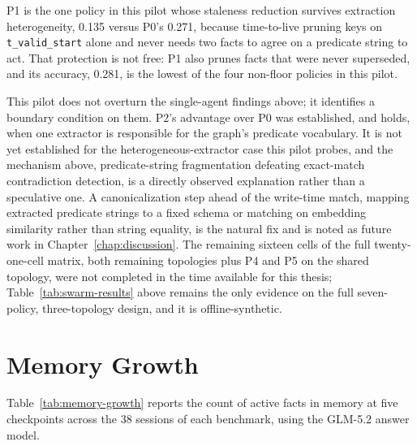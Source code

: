 P1 is the one policy in this pilot whose staleness reduction survives extraction heterogeneity, 0.135 versus P0's 0.271, because time-to-live pruning keys on \texttt{t\_valid\_start} alone and never needs two facts to agree on a predicate string to act. That protection is not free: P1 also prunes facts that were never superseded, and its accuracy, 0.281, is the lowest of the four non-floor policies in this pilot.

This pilot does not overturn the single-agent findings above; it identifies a boundary condition on them. P2's advantage over P0 was established, and holds, when one extractor is responsible for the graph's predicate vocabulary. It is not yet established for the heterogeneous-extractor case this pilot probes, and the mechanism above, predicate-string fragmentation defeating exact-match contradiction detection, is a directly observed explanation rather than a speculative one. A canonicalization step ahead of the write-time match, mapping extracted predicate strings to a fixed schema or matching on embedding similarity rather than string equality, is the natural fix and is noted as future work in Chapter~\ref{chap:discussion}. The remaining sixteen cells of the full twenty-one-cell matrix, both remaining topologies plus P4 and P5 on the shared topology, were not completed in the time available for this thesis; Table~\ref{tab:swarm-results} above remains the only evidence on the full seven-policy, three-topology design, and it is offline-synthetic.

\section{Memory Growth}
\label{sec:memory-growth}

Table~\ref{tab:memory-growth} reports the count of active facts in memory at five checkpoints across the 38 sessions of each benchmark, using the GLM-5.2 answer model.

